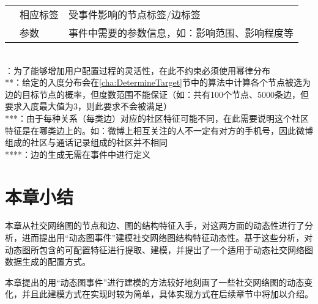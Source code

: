 \begin{table}[htb]
\begin{minipage}[t]{1\textwidth}
\begin{tabularx}{\linewidth}{llX}
       & 相应标签 & 受事件影响的节点标签/边标签 \\\cline{2-3}
       & 参数 & 事件中需要的参数信息，如：影响范围、影响程度等\\
      \bottomrule[1.5pt]
    \end{tabularx}\\[2pt]
    \footnotesize *：为了能够增加用户配置过程的灵活性，在此不约束必须使用幂律分布\\ **：给定的入度分布会在\ref{cha:DetermineTarget}节中的算法中计算各个节点被选为边的目标节点的概率，但度数范围不能保证（如：共有100个节点、5000条边，但要求入度最大值为3，则此要求不会被满足）\\ ***：由于每种关系（每类边）对应的社区特征可能不同，在此需要说明这个社区特征是在哪类边上的。如：微博上相互关注的人不一定有对方的手机号，因此微博组成的社区与通话记录组成的社区并不相同\\ ****：边的生成无需在事件中进行定义
  \end{minipage}
\end{table}

\section{本章小结}

本章从社交网络图的节点和边、图的结构特征入手，对这两方面的动态性进行了分析，进而提出用“动态图事件”建模社交网络图结构特征动态性。基于这些分析，对动态图所包含的可配置特征进行提取、建模，并提出了一个适用于动态社交网络图数据生成的配置方式。

本章提出的用“动态图事件”进行建模的方法较好地刻画了一些社交网络图的动态变化，并且此建模方式在实现时较为简单，具体实现方式在后续章节中将加以介绍。